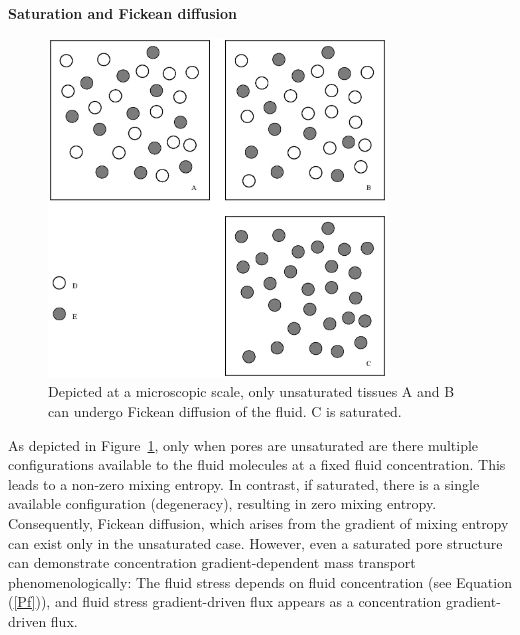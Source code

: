 


{\bf Saturation and Fickean diffusion}

\begin{figure}
\centering
{}
\includegraphics[width=0.8\textwidth]{images/elucidation/saturation}
\caption{Depicted at a microscopic scale, only unsaturated tissues A
  and B can undergo Fickean diffusion of the fluid. C is saturated.}
\label{fick_fig}
\end{figure}

As depicted in Figure~\ref{fick_fig}, only when pores are unsaturated
are there multiple configurations 
available to the fluid molecules at a fixed fluid concentration.  This
leads to a non-zero mixing entropy. In contrast, if saturated, there
is a single available configuration (degeneracy), resulting in
zero mixing entropy. Consequently, Fickean diffusion, which arises
from the gradient of mixing entropy can exist only in the unsaturated
case. However, even a saturated pore structure can demonstrate
concentration gradient-dependent mass transport phenomenologically: The
fluid stress depends on fluid concentration (see Equation (\ref{Pf})),
and fluid stress gradient-driven flux appears as a concentration
gradient-driven flux.

